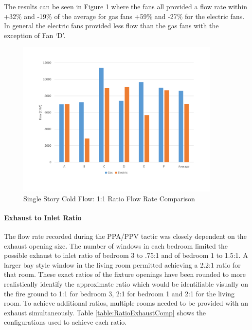 \documentclass{article}
\begin{document}
The results can be seen in Figure \ref{fig:1_1RatioSingleStory} where the fans all provided a flow rate within +32\% and -19\% of the average for gas fans +59\% and -27\% for the electric fans. In general the electric fans provided less flow than the gas fans with the exception of Fan `D'. 

\begin{figure}[H]
	\centering
	\includegraphics[width=4in]{0_Images/ColdFlow/Single_Story/1_1_Ratio.pdf}
	\caption{Single Story Cold Flow: 1:1 Ratio Flow Rate Comparison}
	\label{fig:1_1RatioSingleStory}
\end{figure}

\paragraph{Exhaust to Inlet Ratio} \mbox{}

The flow rate recorded during the PPA/PPV tactic was closely dependent on the exhaust opening size. The number of windows in each bedroom limited the possible exhaust to inlet ratio of bedroom 3 to .75:1 and of bedroom 1 to 1.5:1.  A larger bay style window in the living room permitted achieving a 2.2:1 ratio for that room. These exact ratios of the fixture openings have been rounded to more realistically identify the approximate ratio which would be identifiable visually on the fire ground to 1:1 for bedroom 3, 2:1 for bedroom 1 and 2:1 for the living room. To achieve additional ratios, multiple rooms needed to be provided with an exhaust simultaneously. Table \ref{table:RatioExhaustComp} shows the configurations used to achieve each ratio.
\end{document}
